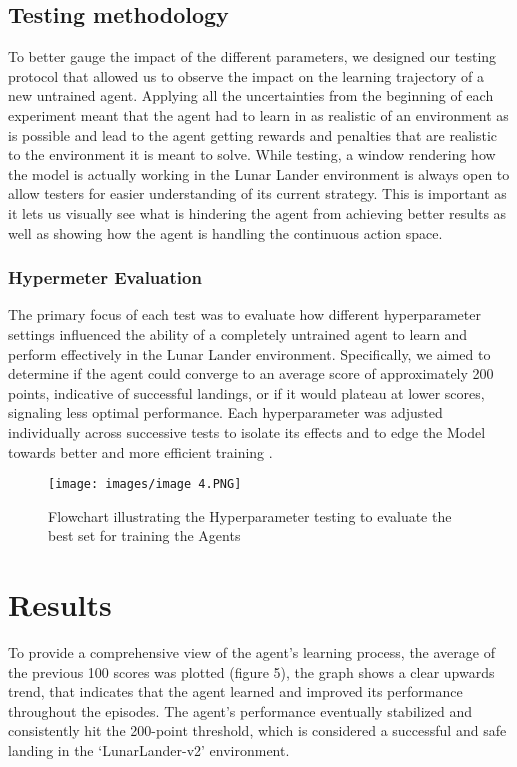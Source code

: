 \documentclass[conference]{IEEEtran}
\begin{document}
\subsection{Testing methodology}

To better gauge the impact of the different parameters, we designed our testing protocol that allowed us to observe the impact on the learning trajectory of a new untrained agent. Applying all the uncertainties from the beginning of each experiment meant that the agent had to learn in as realistic of an environment as is possible and lead to the agent getting rewards and penalties that are realistic to the environment it is meant to solve. 
While testing, a window rendering how the model is actually working in the Lunar Lander environment is always open to allow testers for easier understanding of its current strategy. This is important as it lets us visually see what is hindering the agent from achieving better results as well as showing how the agent is handling the continuous action space.

\subsubsection{Hypermeter Evaluation}
The primary focus of each test was to evaluate how different hyperparameter settings influenced the ability of a completely untrained agent to learn and perform effectively in the Lunar Lander environment. Specifically, we aimed to determine if the agent could converge to an average score of approximately 200 points, indicative of successful landings, or if it would plateau at lower scores, signaling less optimal performance. Each hyperparameter was adjusted individually across successive tests to isolate its effects and to edge the Model towards better and more efficient training \cite{guttulsrud2023solving}.

\begin{figure}[htp]
    \centering
    \texttt{[image: images/image 4.PNG]}
    \caption{Flowchart illustrating the Hyperparameter testing to evaluate the best set for training the Agents}
    \label{fig:Flowchart for hyperparameter testing}
\end{figure}

\section{Results}
To provide a comprehensive view of the agent’s learning process, the average of the previous 100 scores was plotted (figure 5), the graph shows a clear upwards trend, that indicates that the agent learned and improved its performance throughout the episodes. The agent’s performance eventually stabilized and consistently hit the 200-point threshold, which is considered a successful and safe landing in the ‘LunarLander-v2’ environment. 
\end{document}
